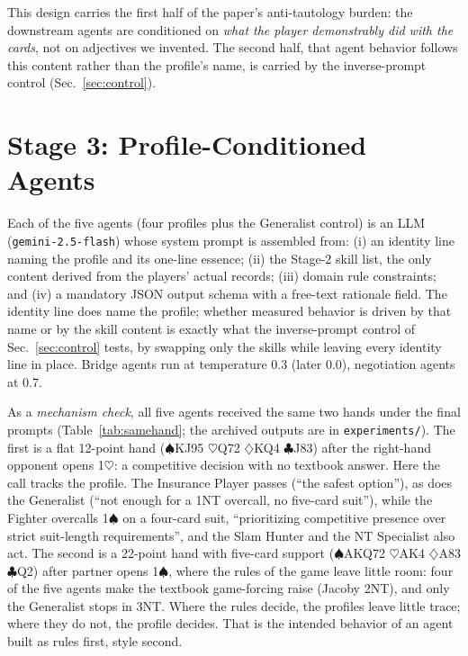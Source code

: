\documentclass[runningheads]{llncs}
\begin{document}
This design carries the first half of the paper's anti-tautology
burden: the downstream agents are conditioned on \emph{what the player
demonstrably did with the cards}, not on adjectives we invented. The
second half, that agent behavior follows this content rather than the
profile's name, is carried by the inverse-prompt control
(Sec.~\ref{sec:control}).

\section{Stage 3: Profile-Conditioned Agents}\label{sec:stage3}

Each of the five agents (four profiles plus the Generalist control) is
an LLM (\texttt{gemini-2.5-flash}) whose system prompt is assembled from: (i) an
identity line naming the profile and its one-line essence; (ii) the
Stage-2 skill list, the only content derived from the players' actual
records; (iii) domain rule constraints; and (iv) a mandatory JSON output
schema with a free-text rationale field. The identity line does name
the profile; whether measured behavior is driven by that name or by the
skill content is exactly what the inverse-prompt control of
Sec.~\ref{sec:control} tests, by swapping only the skills while leaving
every identity line in place. Bridge agents run at temperature 0.3
(later 0.0), negotiation agents at 0.7.

As a \emph{mechanism check}, all five agents received the same two
hands under the final prompts (Table~\ref{tab:samehand}; the archived
outputs are in \texttt{experiments/}). The first is a flat 12-point
hand ($\spadesuit$KJ95 $\heartsuit$Q72 $\diamondsuit$KQ4
$\clubsuit$J83) after the right-hand opponent opens 1$\heartsuit$: a
competitive decision with no textbook answer. Here the call tracks the
profile. The Insurance Player passes (``the safest option''), as does
the Generalist (``not enough for a 1NT overcall, no five-card suit''),
while the Fighter overcalls 1$\spadesuit$ on a four-card suit,
``prioritizing competitive presence over strict suit-length
requirements'', and the Slam Hunter and the NT Specialist also act.
The second is a 22-point hand with five-card support ($\spadesuit$AKQ72
$\heartsuit$AK4 $\diamondsuit$A83 $\clubsuit$Q2) after partner opens
1$\spadesuit$, where the rules of the game leave little room: four of
the five agents make the textbook game-forcing raise (Jacoby 2NT), and
only the Generalist stops in 3NT. Where the rules decide, the profiles
leave little trace; where they do not, the profile decides. That is
the intended behavior of an agent built as rules first, style second.
\end{document}
